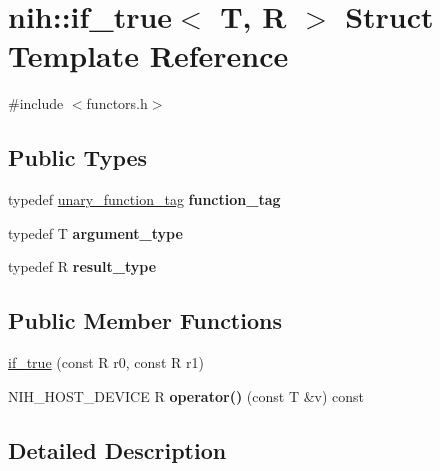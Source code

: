 \hypertarget{structnih_1_1if__true}{
\section{nih\-:\-:if\-\_\-true$<$ \-T, \-R $>$ \-Struct \-Template \-Reference}
\label{structnih_1_1if__true}
}


{\ttfamily \#include $<$functors.\-h$>$}

\subsection*{\-Public \-Types}
\begin{DoxyCompactItemize}
\item 
\hypertarget{structnih_1_1if__true_a3f7a3392397ee3a69f8e4a63dea3e016}{
typedef \hyperlink{structnih_1_1unary__function__tag}{unary\-\_\-function\-\_\-tag} {\bfseries function\-\_\-tag}}
\label{structnih_1_1if__true_a3f7a3392397ee3a69f8e4a63dea3e016}

\item 
\hypertarget{structnih_1_1if__true_a750a24facb05ec988991134bd91d4a68}{
typedef \-T {\bfseries argument\-\_\-type}}
\label{structnih_1_1if__true_a750a24facb05ec988991134bd91d4a68}

\item 
\hypertarget{structnih_1_1if__true_a9c44ccda7324212b196e8c32507e64c3}{
typedef \-R {\bfseries result\-\_\-type}}
\label{structnih_1_1if__true_a9c44ccda7324212b196e8c32507e64c3}

\end{DoxyCompactItemize}
\subsection*{\-Public \-Member \-Functions}
\begin{DoxyCompactItemize}
\item 
\hyperlink{structnih_1_1if__true_a8ed8a1d55039d170080c5bc7f08e253f}{if\-\_\-true} (const \-R r0, const \-R r1)
\item 
\hypertarget{structnih_1_1if__true_a963ab97d17537674c0fb3f13c3fa9f7a}{
\-N\-I\-H\-\_\-\-H\-O\-S\-T\-\_\-\-D\-E\-V\-I\-C\-E \-R {\bfseries operator()} (const \-T \&v) const }
\label{structnih_1_1if__true_a963ab97d17537674c0fb3f13c3fa9f7a}

\end{DoxyCompactItemize}


\subsection{\-Detailed \-Description}
